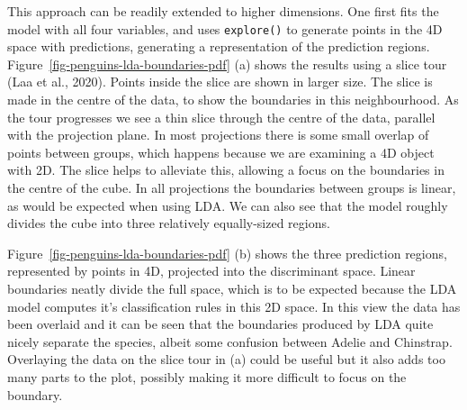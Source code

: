 \documentclass[
  letterpaper,
]{krantz}
\begin{document}
 

This approach can be readily extended to higher dimensions. One first
fits the model with all four variables, and uses \texttt{explore()} to
generate points in the 4D space with predictions, generating a
representation of the prediction regions.
Figure~\ref{fig-penguins-lda-boundaries-pdf} (a) shows the results using
a slice tour (Laa et al., 2020). Points inside the slice are shown in
larger size. The slice is made in the centre of the data, to show the
boundaries in this neighbourhood. As the tour progresses we see a thin
slice through the centre of the data, parallel with the projection
plane. In most projections there is some small overlap of points between
groups, which happens because we are examining a 4D object with 2D. The
slice helps to alleviate this, allowing a focus on the boundaries in the
centre of the cube. In all projections the boundaries between groups is
linear, as would be expected when using LDA. We can also see that the
model roughly divides the cube into three relatively equally-sized
regions.

Figure~\ref{fig-penguins-lda-boundaries-pdf} (b) shows the three
prediction regions, represented by points in 4D, projected into the
discriminant space. Linear boundaries neatly divide the full space,
which is to be expected because the LDA model computes it's
classification rules in this 2D space. In this view the data has been
overlaid and it can be seen that the boundaries produced by LDA quite
nicely separate the species, albeit some confusion between Adelie and
Chinstrap. Overlaying the data on the slice tour in (a) could be useful
but it also adds too many parts to the plot, possibly making it more
difficult to focus on the boundary.

\end{document}
